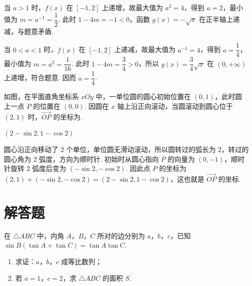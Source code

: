 \begin{solution}
当 \(a>1\) 时，\(f(x)\) 在 \([-1,2]\) 上递增，故最大值为 \(a^2=4\)，得到 \(a=2\)，最小值为 \(m=a^{-1}=\dfrac12\). 此时 \(1-4m=-1<0\)，函数 \(g(x)=-\sqrt{x}\) 在正半轴上递减，与题意矛盾.

当 \(0<a<1\) 时，\(f(x)\) 在 \([-1,2]\) 上递减，故最大值为 \(a^{-1}=4\)，得到 \(a=\dfrac14\)，最小值为 \(m=a^2=\dfrac1{16}\). 此时 \(1-4m=\dfrac34>0\)，所以 \(g(x)=\dfrac34\sqrt{x}\) 在 \((0,+\infty)\) 上递增，符合题意. 因而 \(a=\dfrac14\).
\end{solution}

\begin{problem}
如图，在平面直角坐标系 \(xOy\) 中，一单位圆的圆心初始位置在 \((0,1)\)，此时圆上一点 \(P\) 的位置在 \((0,0)\). 因圆在 \(x\) 轴上沿正向滚动，当圆滚动到圆心位于 \((2,1)\) 时，\(\overrightarrow{OP}\) 的坐标为\fillinblank{}.
\end{problem}

\begin{answer}
\((2-\sin2,1-\cos2)\)
\end{answer}

\begin{solution}
圆心沿正向移动了 2 个单位，单位圆无滑动滚动，所以圆转过的弧长为 2，转过的圆心角为 2 弧度，方向为顺时针. 初始时从圆心指向 \(P\) 的向量为 \((0,-1)\)，顺时针旋转 2 弧度后变为 \((-\sin2,-\cos2)\). 因此点 \(P\) 的坐标为 \((2,1)+(-\sin2,-\cos2)=(2-\sin2,1-\cos2)\)，这也就是 \(\overrightarrow{OP}\) 的坐标.
\end{solution}

\section{解答题}

\begin{problem}
在 \(\triangle ABC\) 中，内角 \(A\)，\(B\)，\(C\) 所对的边分别为 \(a\)，\(b\)，\(c\)，已知 \(\sin B(\tan A+\tan C)=\tan A\tan C\).
\begin{enumerate}
\item 求证：\(a\)，\(b\)，\(c\) 成等比数列；
\item 若 \(a=1\)，\(c=2\)，求 \(\triangle ABC\) 的面积 \(S\).
\end{enumerate}
\end{problem}

